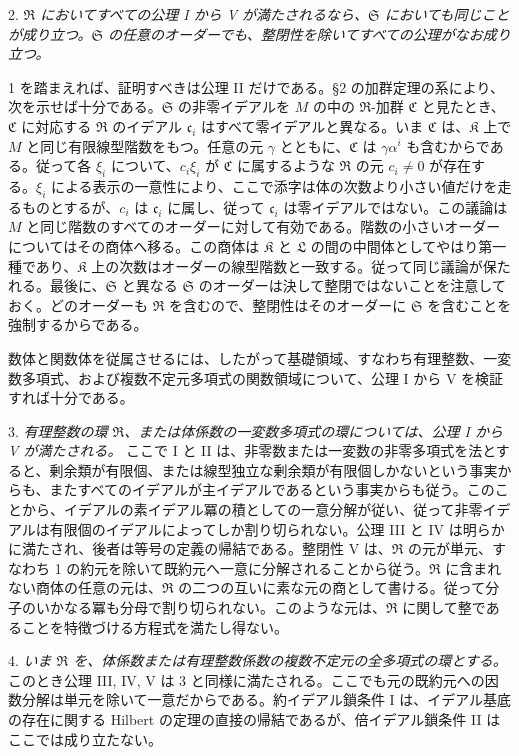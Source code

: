 \documentclass[11pt]{article}
\providecommand{\mR}{\mathfrak{R}}
\providecommand{\mK}{\mathfrak{K}}
\providecommand{\mL}{\mathfrak{L}}
\providecommand{\mS}{\mathfrak{S}}
\providecommand{\mC}{\mathfrak{C}}
\providecommand{\mc}{\mathfrak{c}}
\begin{document}
2. \emph{$\mR$ においてすべての公理 I から V が満たされるなら、$\mS$ においても同じことが成り立つ。$\mS$ の任意のオーダーでも、整閉性を除いてすべての公理がなお成り立つ。}

1 を踏まえれば、証明すべきは公理 II だけである。§2 の加群定理の系により、次を示せば十分である。$\mS$ の非零イデアルを $M$ の中の $\mR$-加群 $\mC$ と見たとき、$\mC$ に対応する $\mR$ のイデアル $\mc_i$ はすべて零イデアルと異なる。いま $\mC$ は、$\mK$ 上で $M$ と同じ有限線型階数をもつ。任意の元 $\gamma$ とともに、$\mC$ は $\gamma\alpha^i$ も含むからである。従って各 $\xi_i$ について、$c_i\xi_i$ が $\mC$ に属するような $\mR$ の元 $c_i\ne0$ が存在する。$\xi_i$ による表示の一意性により、ここで添字は体の次数より小さい値だけを走るものとするが、$c_i$ は $\mc_i$ に属し、従って $\mc_i$ は零イデアルではない。この議論は $M$ と同じ階数のすべてのオーダーに対して有効である。階数の小さいオーダーについてはその商体へ移る。この商体は $\mK$ と $\mL$ の間の中間体としてやはり第一種であり、$\mK$ 上の次数はオーダーの線型階数と一致する。従って同じ議論が保たれる。最後に、$\mS$ と異なる $\mS$ のオーダーは決して整閉ではないことを注意しておく。どのオーダーも $\mR$ を含むので、整閉性はそのオーダーに $\mS$ を含むことを強制するからである。

数体と関数体を従属させるには、したがって基礎領域、すなわち有理整数、一変数多項式、および複数不定元多項式の関数領域について、公理 I から V を検証すれば十分である。

3. \emph{有理整数の環 $\mR$、または体係数の一変数多項式の環については、公理 I から V が満たされる。} ここで I と II は、非零数または一変数の非零多項式を法とすると、剰余類が有限個、または線型独立な剰余類が有限個しかないという事実からも、またすべてのイデアルが主イデアルであるという事実からも従う。このことから、イデアルの素イデアル冪の積としての一意分解が従い、従って非零イデアルは有限個のイデアルによってしか割り切られない。公理 III と IV は明らかに満たされ、後者は等号の定義の帰結である。整閉性 V は、$\mR$ の元が単元、すなわち 1 の約元を除いて既約元へ一意に分解されることから従う。$\mR$ に含まれない商体の任意の元は、$\mR$ の二つの互いに素な元の商として書ける。従って分子のいかなる冪も分母で割り切られない。このような元は、$\mR$ に関して整であることを特徴づける方程式を満たし得ない。

4. \emph{いま $\mR$ を、体係数または有理整数係数の複数不定元の全多項式の環とする。} このとき公理 III, IV, V は 3 と同様に満たされる。ここでも元の既約元への因数分解は単元を除いて一意だからである。約イデアル鎖条件 I は、イデアル基底の存在に関する Hilbert の定理の直接の帰結であるが、倍イデアル鎖条件 II はここでは成り立たない。
\end{document}
